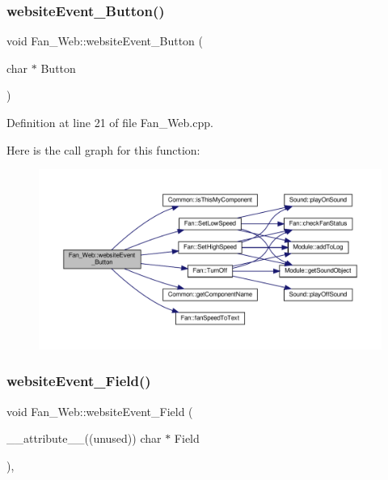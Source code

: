 \subsubsection{\texorpdfstring{website\+Event\+\_\+\+Button()}{websiteEvent\_Button()}}
{\footnotesize\ttfamily void Fan\+\_\+\+Web\+::website\+Event\+\_\+\+Button (\begin{DoxyParamCaption}\item[{char $\ast$}]{Button }\end{DoxyParamCaption})}



Definition at line 21 of file Fan\+\_\+\+Web.\+cpp.

Here is the call graph for this function\+:
\nopagebreak
\begin{figure}[H]
\begin{center}
\leavevmode
\includegraphics[width=350pt]{class_fan___web_a2741ea624a781febbd4f3e2bf82c89ed_cgraph}
\end{center}
\end{figure}
\mbox{\label{class_fan___web_a0546808ac50ae701ca6b1776a1ce50f8}} 
\subsubsection{\texorpdfstring{website\+Event\+\_\+\+Field()}{websiteEvent\_Field()}}
{\footnotesize\ttfamily void Fan\+\_\+\+Web\+::website\+Event\+\_\+\+Field (\begin{DoxyParamCaption}\item[{\+\_\+\+\_\+attribute\+\_\+\+\_\+((unused)) char $\ast$}]{Field }\end{DoxyParamCaption})\hspace{0.3cm}{\ttfamily [inline]}, {\ttfamily [virtual]}}



